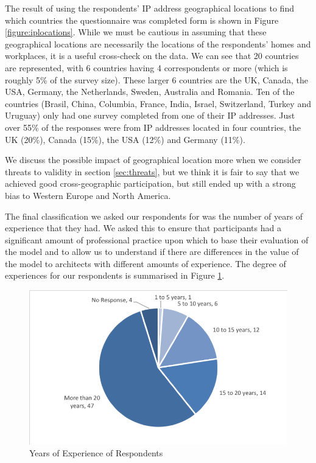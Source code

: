 The result of using the respondents' IP address geographical locations to find which countries the questionnaire was completed form is shown in Figure \ref{figure:iplocations}.  While we must be cautious in assuming that these geographical locations are necessarily the locations of the respondents' homes and workplaces, it is a useful cross-check on the data.  We can see that 20 countries are represented, with 6 countries having 4 correspondents or more (which is roughly 5\% of the survey size).  These larger 6 countries are the UK, Canada, the USA, Germany, the Netherlands, Sweden, Australia and Romania.  Ten of the countries (Brasil, China, Columbia, France, India, Israel, Switzerland, Turkey and Uruguay) only had one survey completed from one of their IP addresses.  Just over 55\% of the responses were from IP addresses located in four countries, the UK (20\%), Canada (15\%), the USA (12\%) and Germany (11\%).

We discuss the possible impact of geographical location more when we consider threats to validity in section \ref{sec:threats}, but we think it is fair to say that we achieved good cross-geographic participation, but still ended up with a strong bias to Western Europe and North America.

The final classification we asked our respondents for was the number of years of experience that they had.  We asked this to ensure that participants had a significant amount of professional practice upon which to base their evaluation of the model and to allow us to understand if there are differences in the value of the model to architects with different amounts of experience.  The degree of experiences for our respondents is summarised in Figure \ref{figure:yearsexp}.
 
\begin{figure}
\centering
\includegraphics[width=12cm]{Figures/prioritisation-yearsexp-detailed}
\caption{Years of Experience of Respondents}
\label{figure:yearsexp}
\end{figure}

